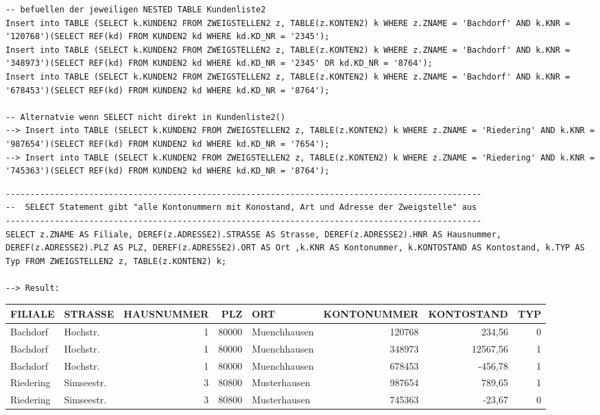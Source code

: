 \documentclass{scrartcl}
\begin{document}
\begin{landscape}
\begin{lstlisting}
-- befuellen der jeweiligen NESTED TABLE Kundenliste2
Insert into TABLE (SELECT k.KUNDEN2 FROM ZWEIGSTELLEN2 z, TABLE(z.KONTEN2) k WHERE z.ZNAME = 'Bachdorf' AND k.KNR = '120768')(SELECT REF(kd) FROM KUNDEN2 kd WHERE kd.KD_NR = '2345');
Insert into TABLE (SELECT k.KUNDEN2 FROM ZWEIGSTELLEN2 z, TABLE(z.KONTEN2) k WHERE z.ZNAME = 'Bachdorf' AND k.KNR = '348973')(SELECT REF(kd) FROM KUNDEN2 kd WHERE kd.KD_NR = '2345' OR kd.KD_NR = '8764');
Insert into TABLE (SELECT k.KUNDEN2 FROM ZWEIGSTELLEN2 z, TABLE(z.KONTEN2) k WHERE z.ZNAME = 'Bachdorf' AND k.KNR = '678453')(SELECT REF(kd) FROM KUNDEN2 kd WHERE kd.KD_NR = '8764');

-- Alternatvie wenn SELECT nicht direkt in Kundenliste2()
--> Insert into TABLE (SELECT k.KUNDEN2 FROM ZWEIGSTELLEN2 z, TABLE(z.KONTEN2) k WHERE z.ZNAME = 'Riedering' AND k.KNR = '987654')(SELECT REF(kd) FROM KUNDEN2 kd WHERE kd.KD_NR = '7654');
--> Insert into TABLE (SELECT k.KUNDEN2 FROM ZWEIGSTELLEN2 z, TABLE(z.KONTEN2) k WHERE z.ZNAME = 'Riedering' AND k.KNR = '745363')(SELECT REF(kd) FROM KUNDEN2 kd WHERE kd.KD_NR = '8764');

\end{lstlisting}
\begin{lstlisting}
-------------------------------------------------------------------------------------------------
--  SELECT Statement gibt "alle Kontonummern mit Konostand, Art und Adresse der Zweigstelle" aus
-------------------------------------------------------------------------------------------------
SELECT z.ZNAME AS Filiale, DEREF(z.ADRESSE2).STRASSE AS Strasse, DEREF(z.ADRESSE2).HNR AS Hausnummer, DEREF(z.ADRESSE2).PLZ AS PLZ, DEREF(z.ADRESSE2).ORT AS Ort ,k.KNR AS Kontonummer, k.KONTOSTAND AS Kontostand, k.TYP AS Typ FROM ZWEIGSTELLEN2 z, TABLE(z.KONTEN2) k;

--> Result:
\end{lstlisting}
\begin{tabular}{ l l r r l r r r }
FILIALE     &         STRASSE             &           HAUSNUMMER    &    PLZ & ORT            &      KONTONUMMER & KONTOSTAND    &    TYP \\
\hline
Bachdorf         &    Hochstr.   &                             1   &   80000 & Muenchhausen  &             120768  &   234,56   &       0 \\
Bachdorf       &      Hochstr.     &                           1   &   80000 & Muenchhausen   &            348973 &  12567,56      &    1 \\
Bachdorf    &         Hochstr.      &                          1  &    80000&  Muenchhausen   &            678453  &  -456,78    &      1 \\
Riedering    &        Simseestr.    &                          3   &   80800& Musterhausen    &          987654   &  789,65    &      1 \\
Riedering    &        Simseestr.    &                          3  &    80800& Musterhausen    &          745363  &   -23,67    &      0 \\
\end{tabular}


\end{landscape}
\end{document}
